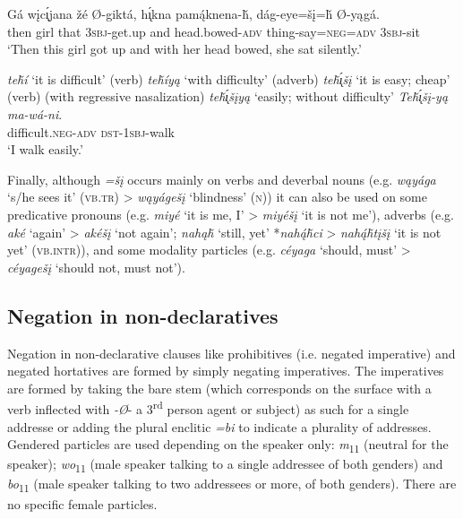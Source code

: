 \documentclass[output=paper,colorlinks,citecolor=brown]{langscibook}
\begin{document}
\ea\label{ex:nak:12}
    \gll Gá wįc\'{\k{ı}}jana žé Ø-giktá, h\'{\k{ı}}kna pam\'{ą}knena-ȟ, dág-eye=šį=ȟ Ø-yągá.\\
         then girl that \textsc{3sbj}-get.up and head.bowed-\textsc{adv} thing-say=\textsc{neg=adv} \textsc{3sbj}-sit \\
    \glt ‘Then this girl got up and with her head bowed, she sat silently.’ \citep[52]{ParksDeMallie2012a}
\z 

\ea\label{ex:nak:13} 
    \ea\label{ex:nak:13a} \textit{teȟí} ‘it is difficult’ (verb) 
    \ex\label{ex:nak:13b} \textit{teȟíyą} ‘with difficulty’ (adverb)
    \ex\label{ex:nak:13c} \textit{teȟ\'{\k{ı}}šį} ‘it is easy; cheap’ (verb) (with regressive nasalization)
    \ex\label{ex:nak:13d} \textit{teȟ\'{\k{ı}}šįyą} ‘easily; without difficulty’
    \ex\label{ex:nak:13e}
        \gll \textit{Teȟ\'{\k{ı}}šį-yą} \textit{ma-wá-ni}.  \\
             difficult.\textsc{neg-adv} \textsc{dst-1sbj}-walk \\
        \glt ‘I walk easily.’
    \z
\z 

Finally, although \textit{=šį} occurs mainly on verbs and deverbal nouns (e.g. \textit{wąyága} ‘s/he sees it’ (\textsc{vb.tr})
> \textit{wąyágešį} ‘blindness’ (\textsc{n})) it can also be used on some predicative pronouns (e.g. \textit{miyé} ‘it is me, I’ > \textit{miyéšį} ‘it is not me’), adverbs (e.g. \textit{aké} ‘again’ > \textit{akéšį} ‘not again’; \textit{nahąȟ} ‘still, yet’ *\textit{nah\'{ą}ȟci} > \textit{nah\'{ą}ȟtįšį} ‘it is not yet’ (\textsc{vb.intr})), and some modality particles (e.g. \textit{céyaga} ‘should, must’ > \textit{céyagešį} ‘should not, must not’).



\subsection{Negation in non-declaratives}\label{sec:nak:2.2}

Negation in non-declarative clauses like prohibitives (i.e. negated imperative) and negated hortatives are formed by simply negating imperatives. The imperatives are formed by taking the bare stem (which corresponds on the surface with a verb inflected with \textit{-Ø}- a 3\textsuperscript{rd} person agent or subject) as such for a single addresse or adding the plural enclitic \textit{=bi} to indicate a plurality of addresses. Gendered particles are used depending on the speaker only: \textit{m}\textsubscript{11} (neutral for the speaker); \textit{wo}\textsubscript{11} (male speaker talking to a single addressee of both genders) and \textit{bo}\textsubscript{11} (male speaker talking to two addressees or more, of both genders). There are no specific female particles.
\end{document}

